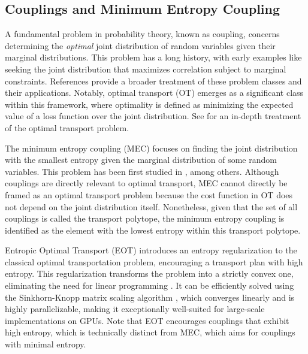 \subsection{Couplings and Minimum Entropy Coupling}
A fundamental problem in probability theory, known as coupling, concerns determining the \textit{optimal} joint distribution of random variables given their marginal distributions. This problem has a long history, with early examples like \cite{frechet1951tableaux} seeking the joint distribution that maximizes correlation subject to marginal constraints. References \cite{den2012probability, lin2014recent, benes2012distributions, yu2018asymptotic} provide a broader treatment of these problem classes and their applications. Notably, optimal transport (OT) emerges as a significant class within this framework, where optimality is defined as minimizing the expected value of a loss function over the joint distribution. See \cite{villani2009optimal} for an in-depth treatment of the optimal transport problem.

The minimum entropy coupling (MEC) focuses on finding the joint distribution with the smallest entropy given the marginal distribution of some random variables. This problem has been first studied in \cite{vidyasagar2012metric, painsky2013memoryless, kovavcevic2015entropy, cicalese2017find}, among others. 
Although couplings are directly relevant to optimal transport, MEC cannot directly be framed as an optimal transport problem because the cost function in OT does not depend on the joint distribution itself. Nonetheless, given that the set of all couplings is called the transport polytope, the minimum entropy coupling is identified as the element with the lowest entropy within this transport polytope.

Entropic Optimal Transport (EOT) introduces an entropy regularization to the classical optimal transportation problem, encouraging a transport plan with high entropy. This regularization transforms the problem into a strictly convex one, eliminating the need for linear programming \cite{cuturi2013sinkhorn}. It can be efficiently solved using the Sinkhorn-Knopp matrix scaling algorithm \cite{knight2008sinkhorn}, which converges linearly and is highly parallelizable, making it exceptionally well-suited for large-scale implementations on GPUs. Note that EOT encourages couplings that exhibit high entropy, which is technically distinct from MEC, which aims for couplings with minimal entropy.

